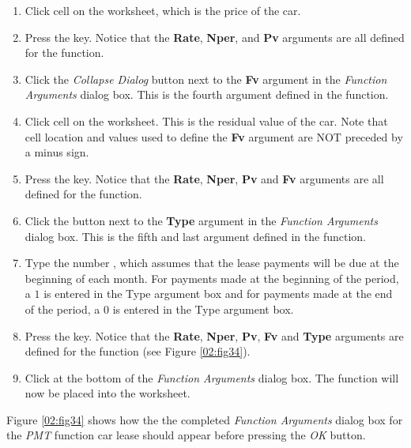 \begin{enumbox}
\begin{enumerate}
		\item Click cell  on the worksheet, which is the price of the car.
		\item Press the  key. Notice that the \textbf{Rate}, \textbf{Nper}, and \textbf{Pv} arguments are all defined for the function.
		\item Click the \textit{Collapse Dialog} button next to the \textbf{Fv} argument in the \textit{Function Arguments} dialog box. This is the fourth argument defined in the function.
		\item Click cell  on the worksheet. This is the residual value of the car. Note that cell location and values used to define the \textbf{Fv} argument are NOT preceded by a minus sign.
		\item Press the  key. Notice that the \textbf{Rate}, \textbf{Nper}, \textbf{Pv} and \textbf{Fv} arguments are all defined for the function.
		\item Click the  button next to the \textbf{Type} argument in the \textit{Function Arguments} dialog box. This is the fifth and last argument defined in the function.
		\item Type the number , which assumes that the lease payments will be due at the beginning of each month. For payments made at the beginning of the period, a $ 1 $ is entered in the Type argument box and for payments made at the end of the period, a $ 0 $ is entered in the Type argument box.
		\item Press the  key. Notice that the \textbf{Rate}, \textbf{Nper}, \textbf{Pv}, \textbf{Fv} and \textbf{Type} arguments are defined for the function (see Figure \ref{02:fig34}).
		\item Click  at the bottom of the \textit{Function Arguments} dialog box. The function will now be placed into the worksheet.
	\end{enumerate}
\end{enumbox}

Figure \ref{02:fig34} shows how the the completed \textit{Function Arguments} dialog box for the \textit{PMT} function car lease should appear before pressing the \textit{OK} button.

